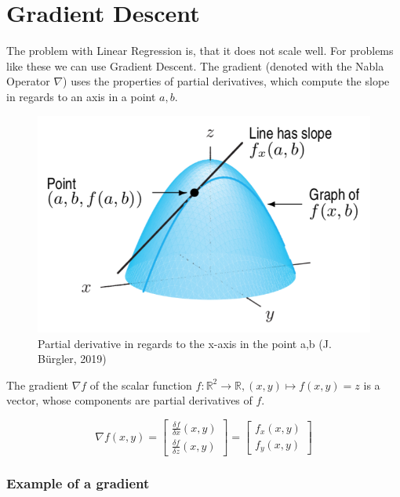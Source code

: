\documentclass[a4paper, 11pt]{article}
\begin{document}
\section{Gradient Descent}
The problem with Linear Regression is, that it does not scale well. For problems like these we can use Gradient Descent. The gradient (denoted with the Nabla Operator $\nabla$) uses the properties of partial derivatives, which compute the slope in regards to an axis in a point $a,b$.

\begin{figure}[tbh!]
	\centering
	\includegraphics[keepaspectratio=true, width=0.8\linewidth]{Pictures/PartialDerivative}
	\caption{Partial derivative in regards to the x-axis in the point a,b (\textcopyright J. Bürgler, 2019)}
	\label{fig:partialderivative}
\end{figure}

The gradient $\nabla f$ of the scalar function $f: \mathbb{R}^2 \rightarrow \mathbb{R}, (x,y) \mapsto f(x,y) = z$ is a vector, whose components are partial derivatives of $f$.

\begin{equation}
	\nabla f(x,y) = 
	\begin{bmatrix}
		\frac{\delta f}{\delta x}(x,y)\\
		\frac{\delta f}{\delta z}(x,y)
	\end{bmatrix}
	=
		\begin{bmatrix}
	f_x (x,y)\\
	f_y (x,y)
	\end{bmatrix}
\end{equation}

\subsubsection{Example of a gradient}
\end{document}
